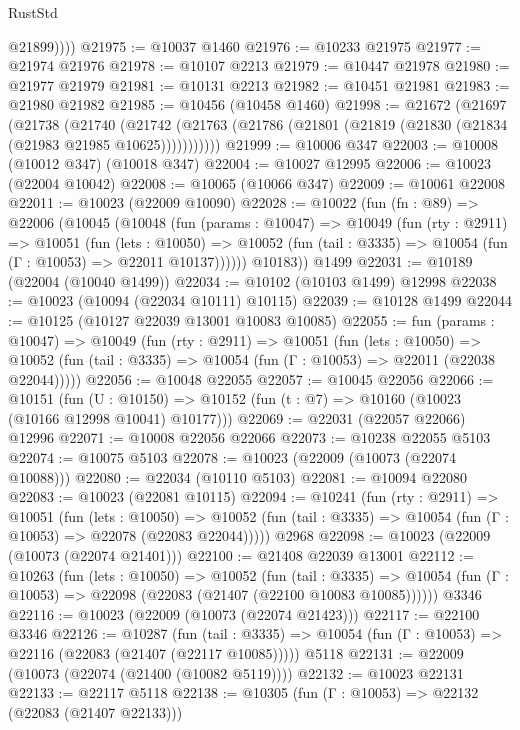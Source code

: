 \begin{lexlean}{RustStd}
\begin{coremodule}
            @21899))))
@21975 := @10037 @1460
@21976 := @10233 @21975
@21977 := @21974 @21976
@21978 := @10107 @2213
@21979 := @10447 @21978
@21980 := @21977 @21979
@21981 := @10131 @2213
@21982 := @10451 @21981
@21983 := @21980 @21982
@21985 := @10456 (@10458 @1460)
@21998 := @21672
    (@21697
      (@21738
        (@21740
          (@21742 (@21763 (@21786 (@21801 (@21819 (@21830 (@21834 (@21983 @21985 @10625)))))))))))
@21999 := @10006 @347
@22003 := @10008 (@10012 @347) (@10018 @347)
@22004 := @10027 @12995
@22006 := @10023 (@22004 @10042)
@22008 := @10065 (@10066 @347)
@22009 := @10061 @22008
@22011 := @10023 (@22009 @10090)
@22028 := @10022
    (fun (fn : @89) =>
    @22006
      (@10045
        (@10048
          (fun (params : @10047) =>
          @10049
            (fun (rty : @2911) =>
            @10051
              (fun (lets : @10050) =>
              @10052 (fun (tail : @3335) => @10054 (fun (Γ : @10053) => @22011 @10137))))))
        @10183))
    @1499
@22031 := @10189 (@22004 (@10040 @1499))
@22034 := @10102 (@10103 @1499) @12998
@22038 := @10023 (@10094 (@22034 @10111) @10115)
@22039 := @10128 @1499
@22044 := @10125 (@10127 @22039 @13001 @10083 @10085)
@22055 := fun (params : @10047) =>
  @10049
    (fun (rty : @2911) =>
    @10051
      (fun (lets : @10050) =>
      @10052 (fun (tail : @3335) => @10054 (fun (Γ : @10053) => @22011 (@22038 @22044)))))
@22056 := @10048 @22055
@22057 := @10045 @22056
@22066 := @10151
    (fun (U : @10150) => @10152 (fun (t : @7) => @10160 (@10023 (@10166 @12998 @10041) @10177)))
@22069 := @22031 (@22057 @22066) @12996
@22071 := @10008 @22056 @22066
@22073 := @10238 @22055 @5103
@22074 := @10075 @5103
@22078 := @10023 (@22009 (@10073 (@22074 @10088)))
@22080 := @22034 (@10110 @5103)
@22081 := @10094 @22080
@22083 := @10023 (@22081 @10115)
@22094 := @10241
    (fun (rty : @2911) =>
    @10051
      (fun (lets : @10050) =>
      @10052 (fun (tail : @3335) => @10054 (fun (Γ : @10053) => @22078 (@22083 @22044)))))
    @2968
@22098 := @10023 (@22009 (@10073 (@22074 @21401)))
@22100 := @21408 @22039 @13001
@22112 := @10263
    (fun (lets : @10050) =>
    @10052
      (fun (tail : @3335) =>
      @10054 (fun (Γ : @10053) => @22098 (@22083 (@21407 (@22100 @10083 @10085))))))
    @3346
@22116 := @10023 (@22009 (@10073 (@22074 @21423)))
@22117 := @22100 @3346
@22126 := @10287
    (fun (tail : @3335) => @10054 (fun (Γ : @10053) => @22116 (@22083 (@21407 (@22117 @10085)))))
    @5118
@22131 := @22009 (@10073 (@22074 (@21400 (@10082 @5119))))
@22132 := @10023 @22131
@22133 := @22117 @5118
@22138 := @10305 (fun (Γ : @10053) => @22132 (@22083 (@21407 @22133)))

\end{coremodule}
\end{lexlean}
